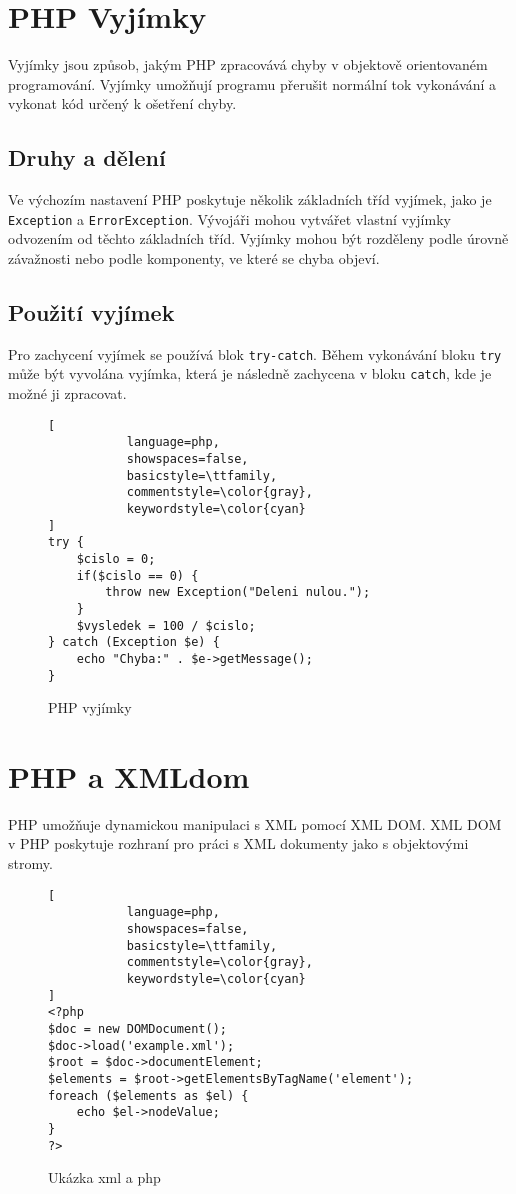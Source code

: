 \section{PHP Vyjímky}
Vyjímky jsou způsob, jakým PHP zpracovává chyby v objektově orientovaném programování. Vyjímky umožňují programu přerušit normální tok vykonávání a vykonat kód určený k ošetření chyby.

\subsection{Druhy a dělení}
Ve výchozím nastavení PHP poskytuje několik základních tříd vyjímek, jako je \texttt{Exception} a \texttt{ErrorException}. Vývojáři mohou vytvářet vlastní vyjímky odvozením od těchto základních tříd. Vyjímky mohou být rozděleny podle úrovně závažnosti nebo podle komponenty, ve které se chyba objeví.

\subsection{Použití vyjímek}
Pro zachycení vyjímek se používá blok \texttt{try-catch}. Během vykonávání bloku \texttt{try} může být vyvolána vyjímka, která je následně zachycena v bloku \texttt{catch}, kde je možné ji zpracovat.

\begin{figure}[H]
\centering
\begin{lstlisting}[
           language=php,
           showspaces=false,
           basicstyle=\ttfamily,
           commentstyle=\color{gray},
           keywordstyle=\color{cyan}
]
try {
    $cislo = 0;
    if($cislo == 0) {
        throw new Exception("Deleni nulou.");
    }
    $vysledek = 100 / $cislo;
} catch (Exception $e) {
    echo "Chyba:" . $e->getMessage();
}
\end{lstlisting}
\caption{PHP vyjímky}
\label{fig:php_exeptions}
\end{figure}

\section{PHP a XMLdom} 
\label{cha:PHP_XMLdom}

PHP umožňuje dynamickou manipulaci s XML pomocí XML DOM. XML DOM v PHP poskytuje rozhraní pro práci s XML dokumenty jako s objektovými stromy.

\begin{figure}[H]
\centering
\begin{lstlisting}[
           language=php,
           showspaces=false,
           basicstyle=\ttfamily,
           commentstyle=\color{gray},
           keywordstyle=\color{cyan}
]
<?php
$doc = new DOMDocument();
$doc->load('example.xml');
$root = $doc->documentElement;
$elements = $root->getElementsByTagName('element');
foreach ($elements as $el) {
    echo $el->nodeValue;
}
?>
\end{lstlisting}
\caption{Ukázka xml a php}
\label{fig:xml_schema}
\end{figure}